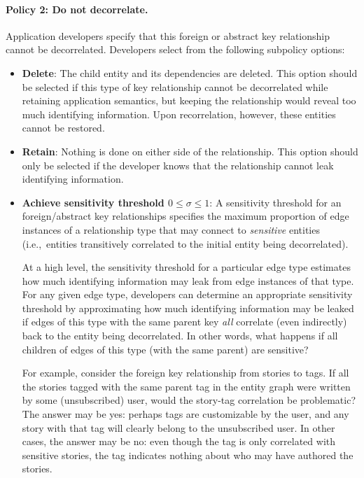 \paragraph{Policy 2: Do not decorrelate.}
Application developers specify that this foreign or abstract key relationship cannot be decorrelated.
Developers select from the following subpolicy options: 
\begin{itemize}
    \item \textbf{Delete}: The child entity and its dependencies are deleted. This option should be
        selected if this type of key relationship cannot be decorrelated while retaining application
        semantics, but keeping the relationship would reveal too much identifying information.
        Upon recorrelation, however, these entities cannot be restored.

    \item \textbf{Retain}: Nothing is done on either side of the
        relationship. This option should only be selected if the developer knows that the
        relationship cannot leak identifying information.

    \item \textbf{Achieve sensitivity threshold $0 \le \sigma \le 1$}:
        A sensitivity threshold for an foreign/abstract key relationships specifies the maximum
        proportion of edge instances of a relationship type that may connect to \emph{sensitive}
        entities (i.e.,\ entities transitively correlated to the initial entity being decorrelated). 

        At a high level, the sensitivity threshold for a particular edge type estimates how much identifying
        information may leak from edge instances of that type.  For any given edge type, developers can
        determine an appropriate sensitivity threshold by approximating how much identifying information
        may be leaked if edges of this type with the same parent key \emph{all} correlate (even indirectly)
        back to the entity being decorrelated. In other words, what happens if all children of edges of this
        type (with the same parent) are sensitive?

        For example, consider the foreign key relationship from stories to tags. If all
        the stories tagged with the same parent tag in the entity graph were written by some
        (unsubscribed) user, would the story-tag correlation be problematic? The answer may be yes: 
        perhaps tags are customizable by the user, and any story with that tag will clearly
        belong to the unsubscribed user. In other cases, the answer may be no: even though the tag is only
        correlated with sensitive stories, the tag indicates nothing about who may have authored the stories.


\end{itemize}
